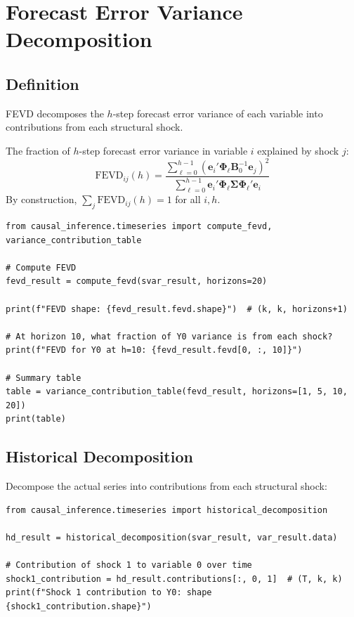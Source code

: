 \section{Forecast Error Variance Decomposition}

\subsection{Definition}

FEVD decomposes the $h$-step forecast error variance of each variable into contributions from each structural shock.

\begin{definition}[FEVD]
The fraction of $h$-step forecast error variance in variable $i$ explained by shock $j$:
\begin{equation}
\text{FEVD}_{ij}(h) = \frac{\sum_{\ell=0}^{h-1} (\mathbf{e}_i' \boldsymbol{\Phi}_\ell \mathbf{B}_0^{-1} \mathbf{e}_j)^2}{\sum_{\ell=0}^{h-1} \mathbf{e}_i' \boldsymbol{\Phi}_\ell \boldsymbol{\Sigma} \boldsymbol{\Phi}_\ell' \mathbf{e}_i}
\end{equation}
By construction, $\sum_j \text{FEVD}_{ij}(h) = 1$ for all $i, h$.
\end{definition}

\begin{verbatim}
from causal_inference.timeseries import compute_fevd, variance_contribution_table

# Compute FEVD
fevd_result = compute_fevd(svar_result, horizons=20)

print(f"FEVD shape: {fevd_result.fevd.shape}")  # (k, k, horizons+1)

# At horizon 10, what fraction of Y0 variance is from each shock?
print(f"FEVD for Y0 at h=10: {fevd_result.fevd[0, :, 10]}")

# Summary table
table = variance_contribution_table(fevd_result, horizons=[1, 5, 10, 20])
print(table)
\end{verbatim}

\subsection{Historical Decomposition}

Decompose the actual series into contributions from each structural shock:

\begin{verbatim}
from causal_inference.timeseries import historical_decomposition

hd_result = historical_decomposition(svar_result, var_result.data)

# Contribution of shock 1 to variable 0 over time
shock1_contribution = hd_result.contributions[:, 0, 1]  # (T, k, k)
print(f"Shock 1 contribution to Y0: shape {shock1_contribution.shape}")
\end{verbatim}


